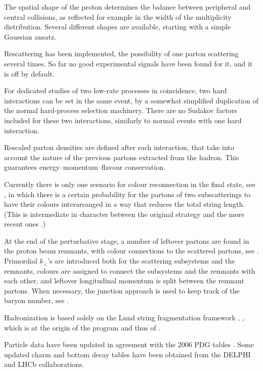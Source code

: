 The spatial shape of the proton determines the balance between 
peripheral and central collisions, as reflected for example in the width 
of the multiplicity distribution. Several different shapes are available,
starting with a simple Gaussian ansatz.

Rescattering has been implemented, \ie the possibility of one parton 
scattering several times. So far no good experimental signals have been 
found for it, and it is off by default.

For dedicated studies of two low-rate processes in coincidence, two
hard interactions can be set in the same event, by a somewhat 
simplified duplication of the normal hard-process selection machinery. 
There are no Sudakov factors included for these two interactions, 
similarly to normal events with one hard interaction.

Rescaled parton densities are defined after each interaction, 
that take into account the nature of the previous partons extracted
from the hadron. This guarantees energy--momentum--flavour conservation.

Currently there is only one scenario for colour reconnection in the 
final state, see , in which there is a certain 
probability for the partons of two subscatterings to have their 
colours interarranged in a way that reduces the total string length. 
(This is intermediate in character between the original strategy 
\cite{Sjostrand:1987su} and the more recent ones \cite{Skands:2010ak}.) 

At the end of the perturbative stage, a number of leftover partons
are found in the proton beam remnants, with colour connections to
the scattered partons, see . Primordial $k_{\perp}$'s 
are introduced both for the scattering subsystems and the remnants, 
colours are assigned to connect the subsystems and the remnants with 
each other, and leftover longitudinal momentum is split between the 
remnant partons. When necessary, the junction approach is used to 
keep track of the baryon number, see .

\mcsubsection{\gensectionhadronize}

Hadronization is based solely on the Lund string fragmentation
framework \cite{Andersson:1983ia,Sjostrand:1984ic}, 
, which is at the origin of the \jetset 
program and thus of \pythia.

Particle data have been updated in agreement with the 2006 PDG
tables \cite{Yao:2006px}.  Some updated charm and bottom decay 
tables have been obtained from the DELPHI and LHCb collaborations.

